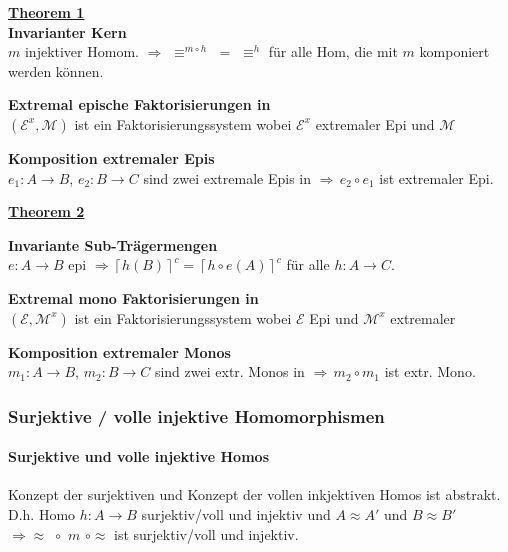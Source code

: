 \begin{multicols}{2}

\textbf{\underline{Theorem 1}} \\

\textbf{ Invarianter Kern} \\
$m$ injektiver Homom. $\Rightarrow \, \, \equiv^{m \circ h} \, \, = \, \, \equiv^h$ für alle Hom, die mit $m$ komponiert werden können.

\textbf{ Extremal epische Faktorisierungen in \syssig} \\
$(\mathcal{E}^{x}, \mathcal{M})$ ist ein Faktorisierungssystem wobei $\mathcal{E}^{x}$ extremaler Epi und $\mathcal{M}$ \mono

\textbf{ Komposition extremaler Epis} \\
$e_1 : A \rightarrow B$, $e_2 : B \rightarrow C$ sind zwei extremale Epis in \syssig $\Rightarrow \, e_2 \circ e_1$ ist extremaler Epi.

\columnbreak
\textbf{\underline{Theorem 2}}

\textbf{ Invariante Sub-Trägermengen} \\
$e: A \rightarrow B$ epi $\Rightarrow \left\lceil h(B) \right\rceil ^{c} = \left\lceil h\circ e(A)\right\rceil ^{c}$ für alle \homos $h: A \rightarrow C$.

\textbf{ Extremal mono Faktorisierungen in \syssig} \\
$(\mathcal{E}, \mathcal{M}^{x})$ ist ein Faktorisierungssystem wobei $\mathcal{E}$ Epi und $\mathcal{M}^{x}$ extremaler \mono

\textbf{ Komposition extremaler Monos} \\
$m_1 : A \rightarrow B$, $m_2 : B \rightarrow C$ sind zwei extr. Monos in \syssig $\Rightarrow \, m_2 \circ m_1$ ist extr. Mono.
\end{multicols}

\subsubsection{Surjektive / volle injektive Homomorphismen}

\paragraph{ Surjektive und volle injektive Homos}
Konzept der surjektiven und Konzept der vollen inkjektiven Homos ist abstrakt. D.h. Homo $h:A \rightarrow B$ surjektiv/voll und injektiv und $A \approx A'$ und $B \approx B'$ $\Rightarrow \approx \, \, \circ \, \, m \, \, \circ \approx$ ist surjektiv/voll und injektiv.


